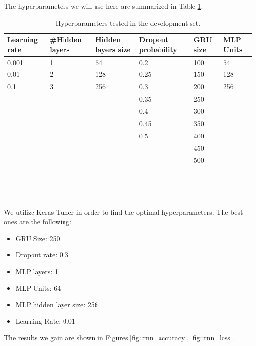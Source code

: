 \documentclass[10pt, a4paper]{article}
\begin{document}
    The hyperparameters we will use here are summarized in Table \ref{tab::ex-1-hyper}.

    	\begin{table}
		\centering
		\begin{tabular}{|l|l|l|l|l|l|}
			\hline
			\rowcolor{blue!25}\textbf{Learning rate} & \cellcolor{blue!25}\textbf{\#Hidden layers} & \cellcolor{blue!25}\textbf{Hidden layers size} & \cellcolor{blue!25}\textbf{Dropout probability} & \cellcolor{blue!25}\textbf{GRU size}  & \cellcolor{blue!25}\textbf{MLP Units}\\
			\hline
			0.001 & 1 & 64 & 0.2 & 100 & 64\\
			\hline
			0.01 & 2 & 128 & 0.25 & 150 & 128\\
			\hline
			0.1 & 3 & 256 & 0.3 & 200 & 256 \\
            \hline 
            & & & 0.35 & 250 & \\
            \hline 
            & & & 0.4 & 300 &\\
            \hline 
            & & & 0.45 & 350 &\\
            \hline 
            & & & 0.5 & 400 &\\
            \hline 
            & & &  & 450 &\\
            \hline 
            & & & & 500 & \\
			
			
			
			\hline
		\end{tabular}
		\caption{Hyperparameters tested in the development set.}
		\label{tab::ex-1-hyper}
	\end{table}

    \ 


    \
    
    We utilize Keras Tuner in order to find the optimal hyperparameters. The best ones are the following:
    \begin{itemize}
        \item GRU Size: 250
        \item Dropout rate: 0.3
        \item MLP layers: 1
        \item MLP Units: 64
        \item MLP hidden layer size: 256
        \item Learning Rate: 0.01
    \end{itemize}

    The results we gain are shown in Figures \ref{fig::rnn_accuracy}, \ref{fig::rnn_loss}.
\end{document}
